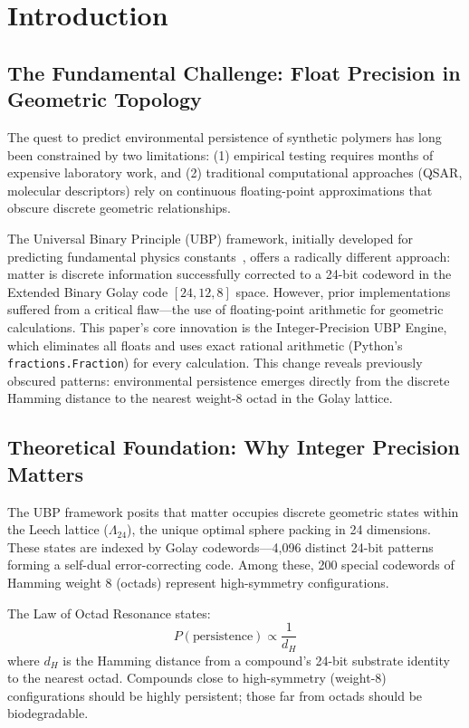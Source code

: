 \documentclass[11pt,letterpaper]{article}
\begin{document}
\section{Introduction}

\subsection{The Fundamental Challenge: Float Precision in Geometric Topology}

The quest to predict environmental persistence of synthetic polymers has long been constrained by two limitations: (1) empirical testing requires months of expensive laboratory work, and (2) traditional computational approaches (QSAR, molecular descriptors) rely on continuous floating-point approximations that obscure discrete geometric relationships.

The Universal Binary Principle (UBP) framework, initially developed for predicting fundamental physics constants~\cite{Craig2026}, offers a radically different approach: matter is discrete information successfully corrected to a 24-bit codeword in the Extended Binary Golay code $[24, 12, 8]$ space. However, prior implementations suffered from a critical flaw---the use of floating-point arithmetic for geometric calculations. This paper's core innovation is the Integer-Precision UBP Engine, which eliminates all floats and uses exact rational arithmetic (Python's \texttt{fractions.Fraction}) for every calculation. This change reveals previously obscured patterns: environmental persistence emerges directly from the discrete Hamming distance to the nearest weight-8 octad in the Golay lattice.

\subsection{Theoretical Foundation: Why Integer Precision Matters}

The UBP framework posits that matter occupies discrete geometric states within the Leech lattice ($\Lambda_{24}$), the unique optimal sphere packing in 24 dimensions. These states are indexed by Golay codewords---4,096 distinct 24-bit patterns forming a self-dual error-correcting code. Among these, 200 special codewords of Hamming weight 8 (octads) represent high-symmetry configurations.

The Law of Octad Resonance states: 
\begin{equation}
P(\text{persistence}) \propto \frac{1}{d_H}
\end{equation}
where $d_H$ is the Hamming distance from a compound's 24-bit substrate identity to the nearest octad. Compounds close to high-symmetry (weight-8) configurations should be highly persistent; those far from octads should be biodegradable.
\end{document}
